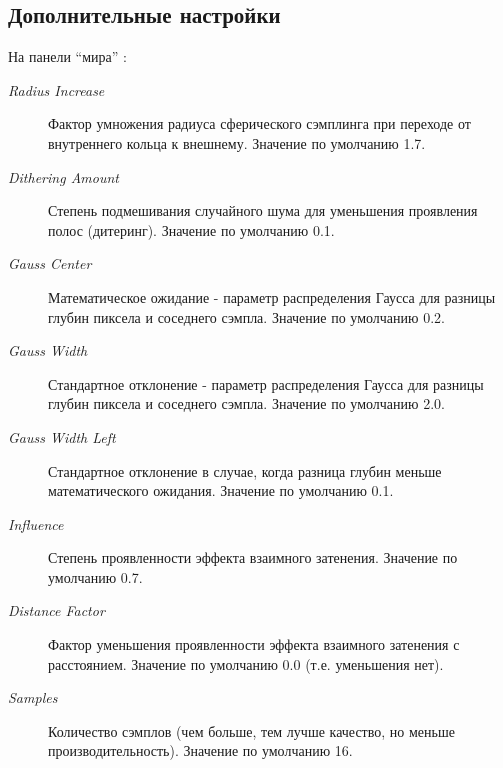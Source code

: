 \documentclass[a4paper,12pt,oneside]{sphinxmanual}
\begin{document}
\subsection{Дополнительные настройки}
\label{postprocessing_effects:id10}
На панели ``мира'' :
\begin{description}
\item[{\emph{Radius Increase}}] \leavevmode
Фактор умножения радиуса сферического сэмплинга при переходе от внутреннего кольца к внешнему. Значение по умолчанию 1.7.

\item[{\emph{Dithering Amount}}] \leavevmode
Степень подмешивания случайного шума для уменьшения проявления полос (дитеринг). Значение по умолчанию 0.1.

\item[{\emph{Gauss Center}}] \leavevmode
Математическое ожидание - параметр распределения Гаусса для разницы глубин пиксела и соседнего сэмпла. Значение по умолчанию 0.2.

\item[{\emph{Gauss Width}}] \leavevmode
Стандартное отклонение - параметр распределения Гаусса для разницы глубин пиксела и соседнего сэмпла. Значение по умолчанию 2.0.

\item[{\emph{Gauss Width Left}}] \leavevmode
Стандартное отклонение в случае, когда разница глубин меньше математического ожидания. Значение по умолчанию 0.1.

\item[{\emph{Influence}}] \leavevmode
Степень проявленности эффекта взаимного затенения. Значение по умолчанию 0.7.

\item[{\emph{Distance Factor}}] \leavevmode
Фактор уменьшения проявленности эффекта взаимного затенения с расстоянием. Значение по умолчанию 0.0 (т.е. уменьшения нет).

\item[{\emph{Samples}}] \leavevmode
Количество сэмплов (чем больше, тем лучше качество, но меньше производительность). Значение по умолчанию 16.

\end{description}
\end{document}
